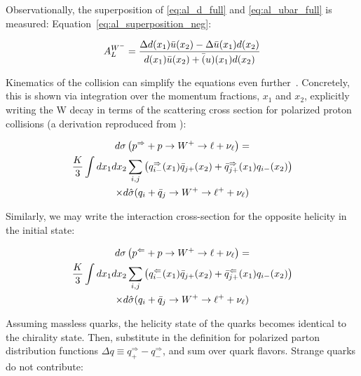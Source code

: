 {\noindent}Observationally, the superposition of \ref{eq:al_d_full} and
\ref{eq:al_ubar_full} is measured:
Equation~\ref{eq:al_superposition_neg}:

\begin{equation}
  {A_L^{W^-}} = 
  {
    {
      \Delta d(x_1)\bar{u}(x_2)-\Delta \bar{u}(x_1)d(x_2)
    }
    \over
    {
      d(x_1)\bar u(x_2)+\bar(u)(x_1)d(x_2)
    }
  }
  \label{eq:al_superposition_neg}
\end{equation}

{\noindent}Kinematics of the collision can simplify the equations even
further~\cite{Aidala2005}. Concretely, this is shown via integration over the
momentum fractions, $x_1$ and $x_2$, explicitly writing the W decay in terms of
the scattering cross section for polarized proton collisions (a derivation
reproduced from \cite{Oide2012}):

\begin{multline}
  {
    d\sigma
    \left(
      p^{\Rightarrow}+p\rightarrow W^+\rightarrow \ell+\nu_{\ell}
    \right)
  } 
  = \\
  {
    {K\over3}\int dx_1dx_2\sum_{i,j}
    \left(
    q_{i-}^\Rightarrow(x_1)\bar{q}_{j+}(x_2) +
    \bar{q}_{j+}^\Rightarrow(x_1)q_{i-}(x_2)
    \right)
  }  \\
  \times
  {
    d\hat{\sigma}(q_i+\bar{q}_j\rightarrow W^+\rightarrow \ell^+ + \nu_{\ell})
  }
\end{multline}

{\noindent}Similarly, we may write the interaction cross-section for the
opposite helicity in the initial state:

\begin{multline}
  {
    d\sigma
    \left(
      p^{\Leftarrow}+p\rightarrow W^+\rightarrow \ell+\nu_{\ell}
    \right)
  } 
  = \\
  {
    {K\over3}\int dx_1dx_2\sum_{i,j}
    \left(
    q_{i-}^\Leftarrow(x_1)\bar{q}_{j+}(x_2) +
    \bar{q}_{j+}^\Leftarrow(x_1)q_{i-}(x_2)
    \right)
  }  \\
  \times
  {
    d\hat{\sigma}(q_i+\bar{q}_j\rightarrow W^+\rightarrow \ell^+ + \nu_{\ell})
  }
\end{multline}

{\noindent}Assuming massless quarks, the helicity state of the quarks becomes
identical to the chirality state. Then, substitute in the definition for
polarized parton distribution functions $\Delta q \equiv q_{+}^{\Rightarrow} -
q_{-}^{\Rightarrow}$, and sum over quark flavors. Strange quarks do not
contribute:

